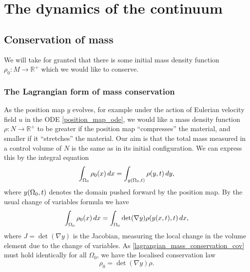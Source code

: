 

\section{The dynamics of the continuum}
\subsection{Conservation of mass}
We will take for granted that there is some initial mass density function $\rho_0:M\rightarrow \mathbb{R}^+$
which we would like to conserve.
\subsubsection{The Lagrangian form of mass conservation}
As the position map $y$ evolves, for example under the action of Eulerian velocity field $u$ in the ODE \eqref{position_map_ode},
we would like a mass density function $\rho : N \rightarrow \mathbb{R}^+$ to be greater if the position map ``compresses'' the material,
and smaller if it ``stretches'' the material. Our aim is that the total mass measured in a control volume of $N$ is the same as in its initial configuration.
We can express this by the integral equation
\begin{equation}\label{lagrangian_mass_conservation}
    \int_{{\Omega_0}} \rho_0(x)\,dx = \int_{y({\Omega_0}, t)} \rho(y, t)\,dy,
\end{equation}
where $y({\Omega_0}, t)$ denotes the domain pushed forward by the position map. By the usual change of variables formula we have
\begin{equation}\label{lagrangian_mass_conservation_cov}
    \int_{{\Omega_0}} \rho_0(x)\,dx = \int_{{\Omega_0}} \det(\nabla y)\rho(y(x,t), t)\,dx,
\end{equation}
where $J = \det(\nabla y)$ is the Jacobian, measuring the local change in the volume element due to the change of variables.
As \eqref{lagrangian_mass_conservation_cov} must hold identically for all $\Omega_0$, we have the localised conservation law
\begin{equation}\label{lagrangian_mass_conservation_local}
    \rho_0 = \det(\nabla y)\rho.
\end{equation}


